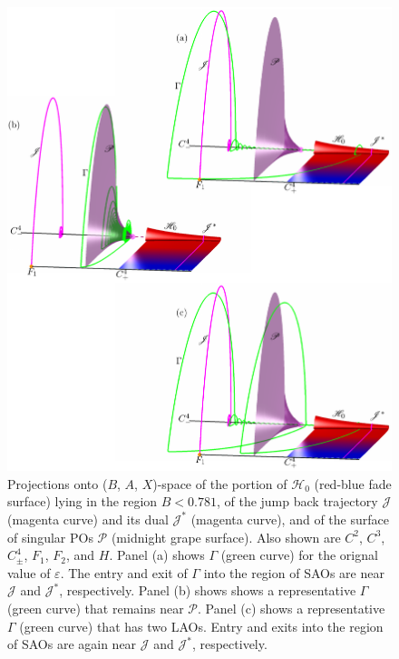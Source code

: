 \documentclass{ws-ijbc}
\begin{document}
\begin{figure}[H]
\centering
\includegraphics[]{./figures/MKMO_14.pdf}
\caption{Projections onto ($B$, $A$, $X$)-space of the portion of $\mathscr{H}_0$ (red-blue fade surface) lying in the region $B<0.781$, of the jump back trajectory $\mathscr{J}$ (magenta curve) and its dual $\mathscr{J}^*$ (magenta curve), and of the surface of singular POs $\mathscr{P}$ (midnight grape surface).  Also shown are $C^2$, $C^3$, $C^4_\pm$, $F_1$, $F_2$, and $H$.  Panel (a) shows $\Gamma$ (green curve) for the orignal value of $\varepsilon$.  The entry and exit of $\Gamma$ into the region of SAOs are near $\mathscr{J}$ and $\mathscr{J}^*$, respectively.  Panel (b) shows shows a representative $\Gamma$ (green curve) that remains near $\mathscr{P}$.  Panel (c) shows a representative $\Gamma$ (green curve) that has two LAOs.  Entry and exits into the region of SAOs are again near $\mathscr{J}$ and $\mathscr{J}^*$, respectively.}
\label{figure_14}
\end{figure}
\end{document}
